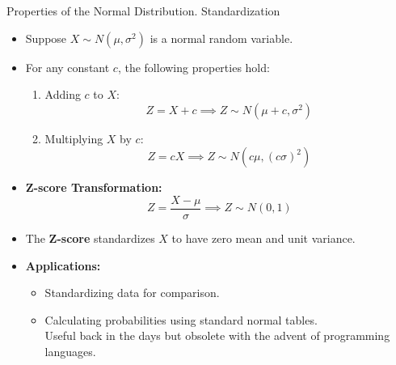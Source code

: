 \documentclass[aspectratio=169]{beamer}
\begin{document}
\begin{frame}{Properties of the Normal Distribution. Standardization}
    \begin{itemize}
        \item Suppose \(X \sim N(\mu, \sigma^2)\) is a normal random variable.
        \item For any constant \(c\), the following properties hold:
        \begin{enumerate}
            \item Adding \(c\) to \(X\):
            \[
            Z = X + c \implies Z \sim N(\mu + c, \sigma^2)
            \]
            \item Multiplying \(X\) by \(c\):
            \[
            Z = cX \implies Z \sim N(c\mu, (c\sigma)^2)
            \]
        \end{enumerate}
        \item \textbf{Z-score Transformation:}
        \[
        Z = \frac{X - \mu}{\sigma} \implies Z \sim N(0, 1)
        \]
        \item The \textbf{Z-score} standardizes \(X\) to have zero mean and unit variance.
        \item \textbf{Applications:}
        \begin{itemize}
            \item[$\bullet$] Standardizing data for comparison.
            \item[$\bullet$] Calculating probabilities using standard normal tables. \\ Useful back in the days but obsolete with the advent of programming languages.
        \end{itemize}
    \end{itemize}
\end{frame}
\end{document}
